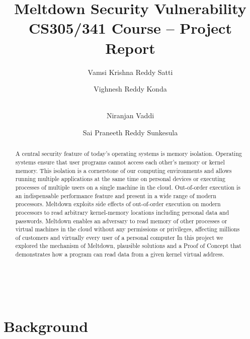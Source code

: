 \documentclass[runningheads]{llncs}
\begin{document}
%
\title{Meltdown Security Vulnerability\\
{\large CS305/341 Course -- Project Report}}
%
%
\author{Vamsi Krishna Reddy Satti \and
Vighnesh Reddy Konda \and
\\Niranjan Vaddi \and
Sai Praneeth Reddy Sunkesula}
%
%
\\
%
\maketitle              %
%
\begin{abstract}
A central security feature of today's operating systems is memory isolation. Operating systems ensure that user programs cannot access each other’s memory or kernel memory. This isolation is a cornerstone of our computing environments and allows running multiple applications at the same time on personal devices or executing processes of multiple users on a single machine in the cloud.
Out-of-order execution  is  an  indispensable  performance  feature  and present in a wide range of modern processors. Meltdown exploits side effects of out-of-order execution on modern processors to read arbitrary kernel-memory locations including personal data  and passwords. Meltdown enables an adversary to read memory of other processes or virtual machines in the cloud without any permissions or privileges, affecting millions of customers and virtually every user of a personal computer
In this project we explored the mechanism of Meltdown, plausible solutions and a Proof of Concept that demonstrates how a program can read data from a given kernel virtual address.

\end{abstract}
%
%
%
\section{Background}
\end{document}
